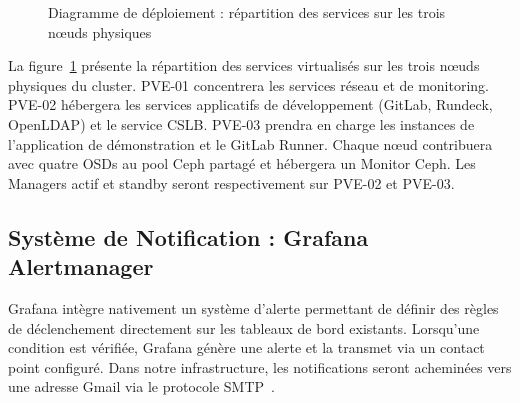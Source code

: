 \begin{figure}[H]
{%
}
\caption{Diagramme de déploiement : répartition des services sur les trois nœuds physiques}
\label{fig:uml-deployment}
\end{figure}

\par La figure~\ref{fig:uml-deployment} présente la répartition des services virtualisés sur les trois nœuds physiques du cluster. PVE-01 concentrera les services réseau et de monitoring. PVE-02 hébergera les services applicatifs de développement (GitLab, Rundeck, OpenLDAP) et le service CSLB. PVE-03 prendra en charge les instances de l'application de démonstration et le GitLab Runner. Chaque nœud contribuera avec quatre OSDs au pool Ceph partagé et hébergera un Monitor Ceph. Les Managers actif et standby seront respectivement sur PVE-02 et PVE-03.\\

\subsection{Système de Notification : Grafana Alertmanager}

\par Grafana intègre nativement un système d'alerte permettant de définir des règles de déclenchement directement sur les tableaux de bord existants. Lorsqu'une condition est vérifiée, Grafana génère une alerte et la transmet via un contact point configuré. Dans notre infrastructure, les notifications seront acheminées vers une adresse Gmail via le protocole SMTP~\cite{ref25}.

